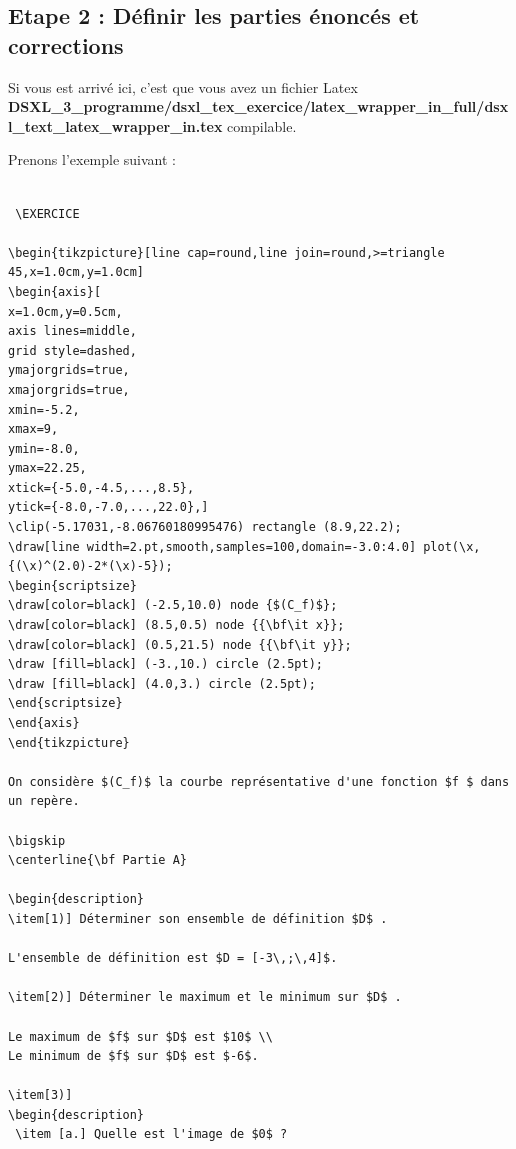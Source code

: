 \subsection{Etape 2 : Définir les parties énoncés et corrections}

Si vous est arrivé ici, c'est que vous avez un fichier Latex  {\bf DSXL\_3\_programme/dsxl\_tex\_exercice/latex\_wrapper\_in\_full/dsxl\_text\_latex\_wrapper\_in.tex} compilable. 

Prenons l'exemple suivant :
{ \tiny
\begin{multicols}{2}
\begin{verbatim} 

 \EXERCICE

\begin{tikzpicture}[line cap=round,line join=round,>=triangle 45,x=1.0cm,y=1.0cm]
\begin{axis}[
x=1.0cm,y=0.5cm,
axis lines=middle,
grid style=dashed,
ymajorgrids=true,
xmajorgrids=true,
xmin=-5.2,
xmax=9,
ymin=-8.0,
ymax=22.25,
xtick={-5.0,-4.5,...,8.5},
ytick={-8.0,-7.0,...,22.0},]
\clip(-5.17031,-8.06760180995476) rectangle (8.9,22.2);
\draw[line width=2.pt,smooth,samples=100,domain=-3.0:4.0] plot(\x,{(\x)^(2.0)-2*(\x)-5});
\begin{scriptsize}
\draw[color=black] (-2.5,10.0) node {$(C_f)$};
\draw[color=black] (8.5,0.5) node {{\bf\it x}};
\draw[color=black] (0.5,21.5) node {{\bf\it y}};
\draw [fill=black] (-3.,10.) circle (2.5pt);
\draw [fill=black] (4.0,3.) circle (2.5pt);
\end{scriptsize}
\end{axis}
\end{tikzpicture}

On considère $(C_f)$ la courbe représentative d'une fonction $f $ dans un repère.

\bigskip
\centerline{\bf Partie A}

\begin{description}
\item[1)] Déterminer son ensemble de définition $D$ .

L'ensemble de définition est $D = [-3\,;\,4]$. 

\item[2)] Déterminer le maximum et le minimum sur $D$ .

Le maximum de $f$ sur $D$ est $10$ \\
Le minimum de $f$ sur $D$ est $-6$. 

\item[3)]  
\begin{description}
 \item [a.] Quelle est l'image de $0$ ?
 

\end{verbatim}
\end{multicols}}
